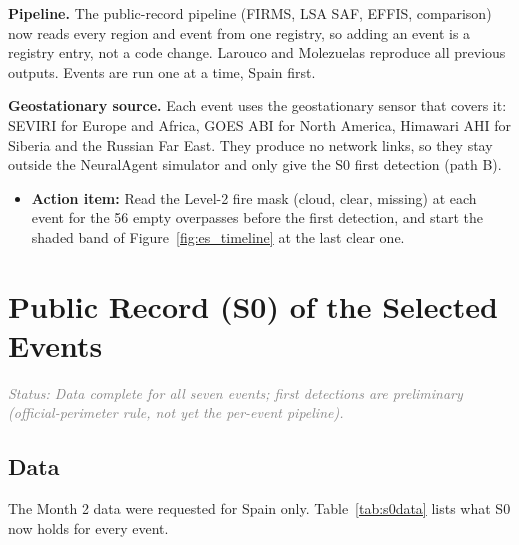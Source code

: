 \documentclass[11pt]{article}
\newcommand{\actionitem}[1]{\textcolor{todo}{\textbf{Action item:}} #1}
\newcommand{\status}[1]{\textit{\textcolor{gray}{Status: #1}}}
\begin{document}
\textbf{Pipeline.} The public-record pipeline (FIRMS, LSA SAF, EFFIS, comparison) now reads every region and event from one registry, so adding an event is a registry entry, not a code change. Larouco and Molezuelas reproduce all previous outputs. Events are run one at a time, Spain first.

\textbf{Geostationary source.} Each event uses the geostationary sensor that covers it: SEVIRI for Europe and Africa, GOES ABI for North America, Himawari AHI for Siberia and the Russian Far East. They produce no network links, so they stay outside the NeuralAgent simulator and only give the S0 first detection (path B).

\begin{itemize}[leftmargin=1.2cm]
    \item \actionitem{Read the Level-2 fire mask (cloud, clear, missing) at each event for the 56 empty overpasses before the first detection, and start the shaded band of Figure~\ref{fig:es_timeline} at the last clear one.}
\end{itemize}

\section{Public Record (S0) of the Selected Events}\label{sec:s0}

\status{Data complete for all seven events; first detections are preliminary (official-perimeter rule, not yet the per-event pipeline).}

\subsection{Data}

The Month 2 data were requested for Spain only. Table~\ref{tab:s0data} lists what S0 now holds for every event.
\end{document}

